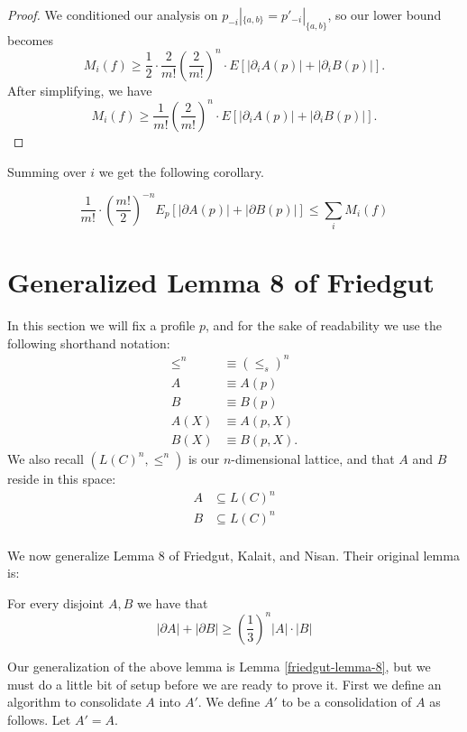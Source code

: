 \begin{proof}
		We conditioned our analysis on $p_{-i}|_{\{a,b\}} = p'_{-i}|_{\{a,b\}}$, so our lower bound becomes
		\[
			M_i(f) \ge \frac{1}{2} \cdot \frac{2}{m!}\left(\frac{2}{m!}\right)^{n} \cdot E \left[ |\partial_i A(p)| + |\partial_i B(p)| \right].
		\]
		After simplifying, we have
		\[
			M_i(f) \ge \frac{1}{m!}\left(\frac{2}{m!}\right)^{n} \cdot E \left[ |\partial_i A(p)| + |\partial_i B(p)| \right].
		\]
	\end{proof}

	Summing over $i$ we get the following corollary.

	\begin{corollary}
		\[
			\frac{1}{m!} \cdot \left(\frac{m!}{2}\right)^{-n} E_p[|\partial A(p)| + |\partial B(p)|] \le \sum_i M_i(f)
		\]
	\end{corollary}


\section{Generalized Lemma 8 of Friedgut}

	In this section we will fix a profile $p$, and for the sake of readability we use the following shorthand notation:
	\begin{align*}
		\le^n &\equiv (\le_s)^n \\
		A &\equiv A(p) \\
		B &\equiv B(p) \\
		A(X) &\equiv A(p, X) \\
		B(X) &\equiv B(p, X).
	\end{align*}
	We also recall $(L(C)^n, \le^n)$ is our $n$-dimensional lattice, and that $A$ and $B$ reside in this space:
	\begin{align*}
		A &\subseteq L(C)^n \\
		B &\subseteq L(C)^n \\
	\end{align*}

	We now generalize Lemma 8 of Friedgut, Kalait, and Nisan. Their original lemma is:

	\begin{lemma}
		For every disjoint $A, B$ we have that
		\[
			|\partial A| + |\partial B| \ge \left( \frac{1}{3} \right)^n |A| \cdot |B|
		\]
	\end{lemma}

	Our generalization of the above lemma is Lemma \ref{friedgut-lemma-8}, but we must do a little bit of setup before we are ready to prove it. First we define an algorithm to consolidate $A$ into $A'$. We define $A'$ to be a consolidation of $A$ as follows. Let $A' = A$.

